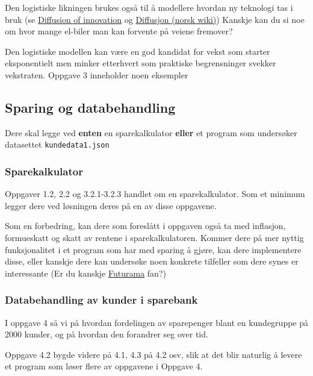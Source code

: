\documentclass[12pt, titlepage]{article}
\begin{document}
Den logistiske likningen brukes også til å modellere hvordan ny teknologi tas i bruk (se \href{https://en.wikipedia.org/wiki/Diffusion_of_innovations}{Diffusion of innovation} og \href{https://no.wikipedia.org/wiki/Diffusjon_(kommunikasjon)}{Diffusjon (norsk wiki)})
Kanskje kan du si noe om hvor mange el-biler man kan forvente på veiene fremover?

Den logistiske modellen kan være en god kandidat for vekst som starter eksponentielt men minker etterhvert som praktiske begrensninger svekker vekstraten.
Oppgave 3 inneholder noen eksempler


\subsection*{Sparing og databehandling}

Dere skal legge ved \textbf{enten} en sparekalkulator \textbf{eller} et program som undersøker datasettet \texttt{kundedata1.json}

\subsubsection*{Sparekalkulator}

Oppgaver 1.2, 2.2 og 3.2.1-3.2.3 handlet om en sparekalkulator.
Som et minimum legger dere ved løsningen deres på en av disse oppgavene.

Som en forbedring, kan dere som foreslått i oppgaven også ta med inflasjon, formueskatt og skatt av rentene i sparekalkulatoren.
Kommer dere på mer nyttig funksjonalitet i et program som har med sparing å gjøre, kan dere implementere disse,
eller kanskje dere kan undersøke noen konkrete tilfeller som dere synes er interessante (Er du kanskje \href{https://www.imdb.com/title/tt0584425/}{Futurama} fan?)

\subsubsection*{Databehandling av kunder i sparebank}

I oppgave 4 så vi på hvordan fordelingen av sparepenger blant en kundegruppe på 2000 kunder, og på hvordan den  forandrer seg over tid.

Oppgave 4.2 bygde videre på 4.1, 4.3 på 4.2 osv, slik at det blir naturlig å levere et program som løser flere av oppgavene i Oppgave 4.
\end{document}
